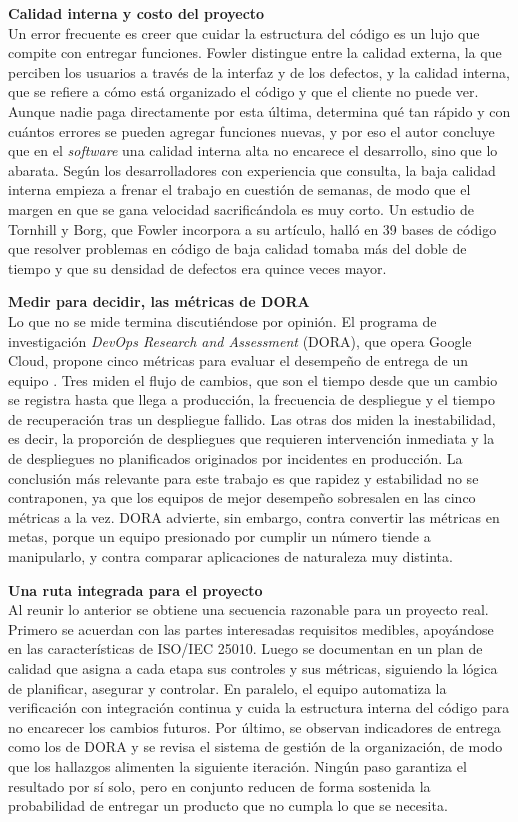\documentclass[12pt,letterpaper]{article}
\begin{document}
\textbf{Calidad interna y costo del proyecto}\\
Un error frecuente es creer que cuidar la estructura del código es un lujo que compite con entregar funciones. Fowler \parencite*{fowler_calidad_2019} distingue entre la calidad externa, la que perciben los usuarios a través de la interfaz y de los defectos, y la calidad interna, que se refiere a cómo está organizado el código y que el cliente no puede ver. Aunque nadie paga directamente por esta última, determina qué tan rápido y con cuántos errores se pueden agregar funciones nuevas, y por eso el autor concluye que en el \textit{software} una calidad interna alta no encarece el desarrollo, sino que lo abarata. Según los desarrolladores con experiencia que consulta, la baja calidad interna empieza a frenar el trabajo en cuestión de semanas, de modo que el margen en que se gana velocidad sacrificándola es muy corto. Un estudio de Tornhill y Borg, que Fowler incorpora a su artículo, halló en 39 bases de código que resolver problemas en código de baja calidad tomaba más del doble de tiempo y que su densidad de defectos era quince veces mayor.

\textbf{Medir para decidir, las métricas de DORA}\\
Lo que no se mide termina discutiéndose por opinión. El programa de investigación \textit{DevOps Research and Assessment} (DORA), que opera Google Cloud, propone cinco métricas para evaluar el desempeño de entrega de un equipo \parencite{dora_metricas_2026}. Tres miden el flujo de cambios, que son el tiempo desde que un cambio se registra hasta que llega a producción, la frecuencia de despliegue y el tiempo de recuperación tras un despliegue fallido. Las otras dos miden la inestabilidad, es decir, la proporción de despliegues que requieren intervención inmediata y la de despliegues no planificados originados por incidentes en producción. La conclusión más relevante para este trabajo es que rapidez y estabilidad no se contraponen, ya que los equipos de mejor desempeño sobresalen en las cinco métricas a la vez. DORA advierte, sin embargo, contra convertir las métricas en metas, porque un equipo presionado por cumplir un número tiende a manipularlo, y contra comparar aplicaciones de naturaleza muy distinta.

\textbf{Una ruta integrada para el proyecto}\\
Al reunir lo anterior se obtiene una secuencia razonable para un proyecto real. Primero se acuerdan con las partes interesadas requisitos medibles, apoyándose en las características de ISO/IEC 25010. Luego se documentan en un plan de calidad que asigna a cada etapa sus controles y sus métricas, siguiendo la lógica de planificar, asegurar y controlar. En paralelo, el equipo automatiza la verificación con integración continua y cuida la estructura interna del código para no encarecer los cambios futuros. Por último, se observan indicadores de entrega como los de DORA y se revisa el sistema de gestión de la organización, de modo que los hallazgos alimenten la siguiente iteración. Ningún paso garantiza el resultado por sí solo, pero en conjunto reducen de forma sostenida la probabilidad de entregar un producto que no cumpla lo que se necesita.
\end{document}
